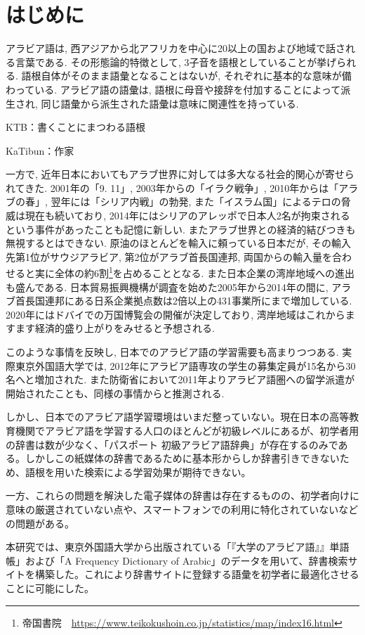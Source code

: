\documentclass[technicalreport]{ieicej}
\begin{document}
\section{はじめに}
アラビア語は, 西アジアから北アフリカを中心に20以上の国および地域で話される言葉である. その形態論的特徴として, 3子音を語根としていることが挙げられる. 語根自体がそのまま語彙となることはないが, それぞれに基本的な意味が備わっている. アラビア語の語彙は, 語根に母音や接辞を付加することによって派生され, 同じ語彙から派生された語彙は意味に関連性を持っている.

KTB：書くことにまつわる語根

KaTibun：作家

一方で, 近年日本においてもアラブ世界に対しては多大なる社会的関心が寄せられてきた. 2001年の「9. 11」, 2003年からの「イラク戦争」, 2010年からは「アラブの春」, 翌年には「シリア内戦」の勃発, また「イスラム国」によるテロの脅威は現在も続いており, 2014年にはシリアのアレッポで日本人2名が拘束されるという事件があったことも記憶に新しい. またアラブ世界との経済的結びつきも無視するとはできない. 原油のほとんどを輸入に頼っている日本だが, その輸入先第1位がサウジアラビア, 第2位がアラブ首長国連邦, 両国からの輸入量を合わせると実に全体の約6割\footnote{帝国書院　\url{https://www.teikokushoin.co.jp/statistics/map/index16.html}}を占めることとなる. また日本企業の湾岸地域への進出も盛んである. 日本貿易振興機構が調査を始めた2005年から2014年の間に, アラブ首長国連邦にある日系企業拠点数は2倍以上の431事業所にまで増加している. 2020年にはドバイでの万国博覧会の開催が決定しており, 湾岸地域はこれからますます経済的盛り上がりをみせると予想される. 

このような事情を反映し, 日本でのアラビア語の学習需要も高まりつつある. 実際東京外国語大学では, 2012年にアラビア語専攻の学生の募集定員が15名から30名へと増加された. また防衛省において2011年よりアラビア語圏への留学派遣が開始されたことも、同様の事情からと推測される. 

しかし、日本でのアラビア語学習環境はいまだ整っていない。現在日本の高等教育機関でアラビア語を学習する人口のほとんどが初級レベルにあるが、初学者用の辞書は数が少なく、「パスポート 初級アラビア語辞典」が存在するのみである。しかしこの紙媒体の辞書であるために基本形からしか辞書引きできないため、語根を用いた検索による学習効果が期待できない。

一方、これらの問題を解決した電子媒体の辞書は存在するものの、初学者向けに意味の厳選されていない点や、スマートフォンでの利用に特化されていないなどの問題がある。

本研究では、東京外国語大学から出版されている「『大学のアラビア語』』単語帳」および「A Frequency Dictionary of Arabic」のデータを用いて、辞書検索サイトを構築した。これにより辞書サイトに登録する語彙を初学者に最適化させることに可能にした。
\end{document}
